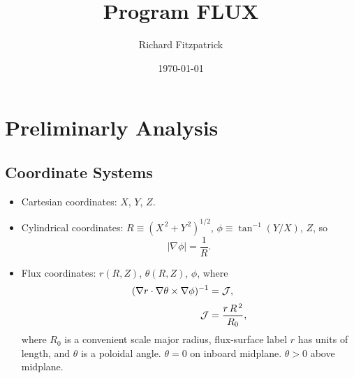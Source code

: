 \documentclass[notitlepage,12pt]{article}
\title{\bf Program FLUX}
\date{\today}
\author{Richard Fitzpatrick}
\begin{document}
\maketitle

\section{Preliminarly Analysis}
\subsection{Coordinate Systems}
\begin{itemize}
\item Cartesian coordinates: $X$, $Y$, $Z$.
\item Cylindrical coordinates: $R\equiv (X^{\,2}+Y^{\,2})^{1/2}$, $\phi\equiv \tan^{-1}(Y/X)$, $Z$,
so
\begin{equation}
|\nabla\phi| = \frac{1}{R}.
\end{equation}
\item Flux coordinates: $r(R,Z)$, $\theta(R,Z)$, $\phi$, where
\begin{align}\label{e1}
(\nabla r\cdot\nabla\theta\times \nabla\phi)^{-1} &= {\cal J},\\[0.5ex]
{\cal J} &=\frac{r\,R^{\,2}}{R_0},\label{e2}
\end{align}
where $R_0$ is a convenient scale major radius, flux-surface label $r$ has units of length, and $\theta$ is
a poloidal angle. $\theta=0$ on inboard midplane. $\theta>0$ above midplane. 
\end{itemize}
\end{document}
